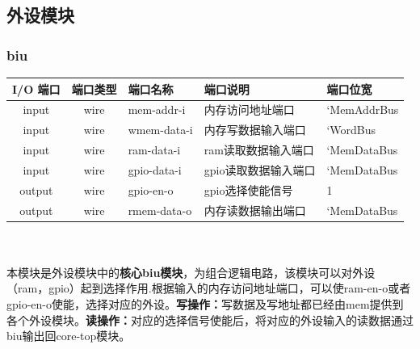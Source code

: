 \documentclass[lang=cn,11pt,a4paper]{elegantpaper}
\begin{document}
\subsection{外设模块}
\subsubsection{biu}
\begin{tabular}{cclll}
	\toprule
	I/O 端口 & 端口类型 &端口名称&端口说明 &端口位宽\\
	\midrule
	input &wire& mem-addr-i & 内存访问地址端口 & `MemAddrBus \\
	input &wire& wmem-data-i & 内存写数据输入端口 & `WordBus  \\
	input &wire& ram-data-i & ram读取数据输入端口 & `MemDataBus  \\
	input &wire& gpio-data-i & gpio读取数据输入端口 & `MemDataBus  \\
		
	output &wire& gpio-en-o &   gpio选择使能信号  & 1  \\
	output &wire& rmem-data-o & 内存读数据输出端口    & `MemDataBus  \\
	\bottomrule
\end{tabular}\\
\\
本模块是外设模块中的\textbf{核心biu模块}，为组合逻辑电路，该模块可以对外设（ram，gpio）起到选择作用.根据输入的内存访问地址端口，可以使ram-en-o或者gpio-en-o使能，选择对应的外设。\textbf{写操作：}写数据及写地址都已经由mem提供到各个外设模块。\textbf{读操作：}对应的选择信号使能后，将对应的外设输入的读数据通过biu输出回core-top模块。
\end{document}
